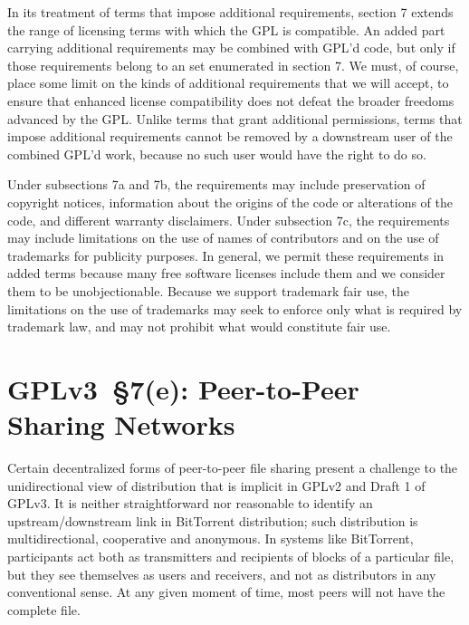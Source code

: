 
In its treatment of terms that impose additional requirements, section 7
extends the range of licensing terms with which the GPL is compatible. An
added part carrying additional requirements may be combined with GPL'd code,
but only if those requirements belong to an set enumerated in section 7. We
must, of course, place some limit on the kinds of additional requirements
that we will accept, to ensure that enhanced license compatibility does not
defeat the broader freedoms advanced by the GPL. Unlike terms that grant
additional permissions, terms that impose additional requirements cannot be
removed by a downstream user of the combined GPL'd work, because no such user
would have the right to do so.


Under subsections 7a and 7b, the requirements may include preservation of
copyright notices, information about the origins of the code or alterations
of the code, and different warranty disclaimers. Under subsection 7c, the
requirements may include limitations on the use of names of contributors and
on the use of trademarks for publicity purposes. In general, we permit these
requirements in added terms because many free software licenses include them
and we consider them to be unobjectionable. Because we support trademark fair
use, the limitations on the use of trademarks may seek to enforce only what
is required by trademark law, and may not prohibit what would constitute fair
use.


\section{GPLv3~\S7(e): Peer-to-Peer Sharing Networks}


Certain decentralized forms of peer-to-peer file sharing present a challenge
to the unidirectional view of distribution that is implicit in GPLv2 and
Draft 1 of GPLv3.  It is neither straightforward nor reasonable to identify
an upstream/downstream link in BitTorrent distribution; such distribution is
multidirectional, cooperative and anonymous.  In systems like BitTorrent,
participants act both as transmitters and recipients of blocks of a
particular file, but they see themselves as users and receivers, and not as
distributors in any conventional sense.  At any given moment of time, most
peers will not have the complete file.

